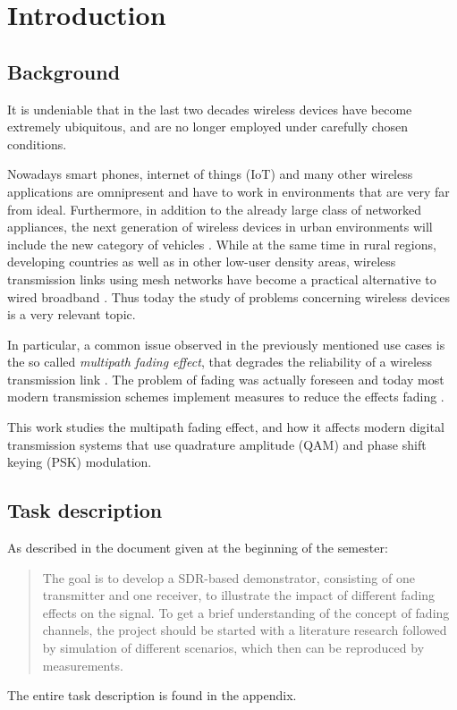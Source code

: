
\chapter{Introduction} \label{chp:introduction}

\section{Background}

It is undeniable that in the last two decades wireless devices have become extremely ubiquitous, and are no longer employed under carefully chosen conditions.

Nowadays smart phones, internet of things (IoT) and many other wireless applications are omnipresent and have to work in environments that are very far from ideal. Furthermore, in addition to the already large class of networked appliances, the next generation of wireless devices in urban environments will include the new category of vehicles \cite{AntonescuTB17}. While at the same time in rural regions, developing countries as well as in other low-user density areas, wireless transmission links using mesh networks have become a practical alternative to wired broadband \cite{Macmillan2019tidal,Subramanian2006rethinking,Flickenger2007wireless}. Thus today the study of problems concerning wireless devices is a very relevant topic.

In particular, a common issue observed in the previously mentioned use cases is the so called \emph{multipath fading effect}, that degrades the reliability of a wireless transmission link \cite{Mathis, Gallager}. The problem of fading was actually foreseen \cite{Frederiksen2002overview,Maddocks1993introduction} and today most modern transmission schemes implement measures to reduce the effects fading \cite{Mathis,Hsu}.

This work studies the multipath fading effect, and how it affects modern digital transmission systems that use quadrature amplitude (QAM) and phase shift keying (PSK) modulation.

\section{Task description}

As described in the document given at the beginning of the semester:
\begin{quote}
	The goal is to develop a SDR-based demonstrator, consisting of one transmitter and one receiver, to illustrate the impact of different fading effects on the signal. To get a brief understanding of the concept of fading channels, the project should be started with a literature research followed by simulation of different scenarios, which then can be reproduced by measurements.
\end{quote}
The entire task description is found in the appendix.

